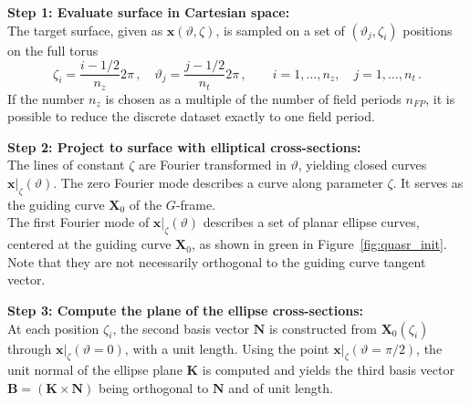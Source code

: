 \documentclass[12pt]{iopart}
\newcommand\hladdedrev[1]{#1} %
\newcommand\X{{\bm{X}}_0}
\newcommand\xcont{{{\bm x}|_\zeta}}
\newcommand\Nnew{{\bm N}}
\newcommand\Bnew{{\bm B}}
\newcommand\K{{\bm K}}
\newcommand\GFF{$G$-frame}
\newcommand{\thet}{\vartheta}
\begin{document}
\hladdedrev{
\textbf{Step 1: Evaluate surface in Cartesian space:}\\
    The target surface, given as $\bm x(\thet,\zeta)$, is sampled on a set of $(\thet_j,\zeta_i)$ positions on the full torus
    \begin{equation}
         \zeta_i=\frac{i-1/2}{n_z}2\pi\,,\quad 
         \thet_j=\frac{j-1/2}{n_t}2\pi\,,\qquad i=1,\dots,n_z ,\quad j=1,\dots,n_t\,.
    \end{equation} 
    If the number $n_z$ is chosen as a multiple of the number of field periods $n_{FP}$, it is possible to reduce the discrete dataset exactly to one field period.}

\hladdedrev{
\textbf{Step 2: Project to surface with elliptical cross-sections:}\\
    The lines of constant $\zeta$ are Fourier transformed in $\thet$, yielding closed curves $\xcont(\thet)$. The zero Fourier mode describes a curve along parameter $\zeta$. It serves as the guiding curve $\X$ of the \GFF{}. 
    \\
    The first Fourier mode of $\xcont(\thet)$ describes a set of planar ellipse curves, centered at the guiding curve $\X$, as shown in green in Figure~\ref{fig:quasr_init}. Note that they are not necessarily orthogonal to the guiding curve tangent vector.}

\hladdedrev{
\textbf{Step 3: Compute the plane of the ellipse cross-sections:}\\
    At each position $\zeta_i$, the second basis vector $\Nnew$ is constructed from $\X(\zeta_i)$ through $\xcont(\thet=0)$, with a unit length. 
    Using the point $\xcont(\thet=\pi/2)$, the unit normal of the ellipse plane $\K$ is computed and yields the third basis vector $\Bnew=(\K\times\Nnew)$ being orthogonal to $\Nnew $ and of unit length.}
\end{document}
